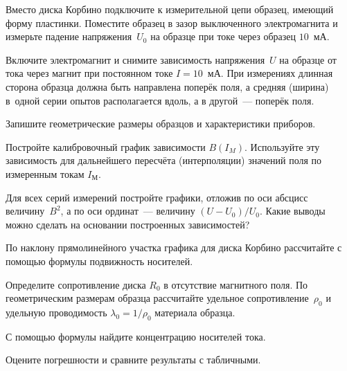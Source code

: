 \begin{lab:task}
\item Вместо диска Корбино подключите к измерительной цепи образец, имеющий
форму пластинки. Поместите образец в зазор выключенного электромагнита и
измерьте падение напряжения~$U_0$ на образце при токе через образец $10$~мА.

\item Включите электромагнит и снимите зависимость напряжения~$U$ на образце от
тока через магнит при постоянном токе $I=10$~мА. При измерениях длинная сторона
образца должна быть направлена поперёк поля, а средняя (ширина) в~одной серии
опытов располагается вдоль, а в другой~--- поперёк поля.

\item Запишите геометрические размеры образцов и характеристики приборов.


\item Постройте калибровочный график зависимости $B(I_{M})$. 
    Используйте эту зависимость для дальнейшего пересчёта (интерполяции)
    значений поля по измеренным токам $I_{М}$.

\item Для всех серий измерений постройте графики, отложив по оси абсцисс
величину~$B^2$, а по оси ординат~--- величину $(U-U_0)/U_0$. Какие выводы
можно сделать на основании построенных зависимостей?

\item По наклону прямолинейного участка графика для диска Корбино рассчитайте
с помощью формулы  подвижность носителей.

\item Определите сопротивление диска $R_0$ в отсутствие магнитного поля.
По геометрическим размерам образца рассчитайте удельное сопротивление~$\rho_0$ 
и удельную проводимость $\lambda_0=1/\rho_0$ материала образца.

\item С помощью формулы  найдите концентрацию носителей
тока.

\item Оцените погрешности и сравните результаты с табличными.

\end{lab:task}


